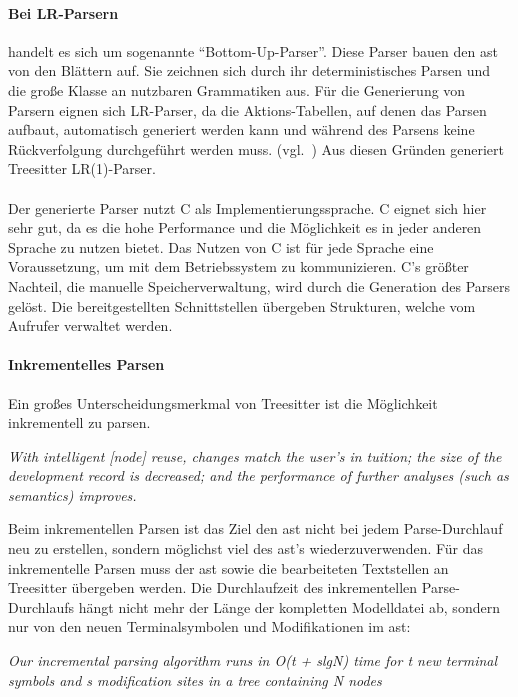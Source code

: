 \documentclass[./einleitung.tex]{subfiles}
\begin{document}
\paragraph[LR-Parsern]{Bei LR-Parsern}\label{par:lr-parser} handelt es sich um sogenannte ``Bottom-Up-Parser''.
Diese Parser bauen den \acrshort{ast} von den Blättern auf.
Sie zeichnen sich durch ihr deterministisches Parsen und die große Klasse an nutzbaren Grammatiken aus.\newline
Für die Generierung von Parsern eignen sich LR-Parser, da die Aktions-Tabellen, auf denen das Parsen aufbaut, automatisch generiert werden kann und während des Parsens keine Rückverfolgung durchgeführt werden muss. (vgl.~\cite{aho1974lr})
Aus diesen Gründen generiert Treesitter LR(1)-Parser.
\\\\
Der generierte Parser nutzt C als Implementierungssprache.
C eignet sich hier sehr gut, da es die hohe Performance und die Möglichkeit es in jeder anderen Sprache zu nutzen bietet.
Das Nutzen von C ist für jede Sprache eine Voraussetzung, um mit dem Betriebssystem zu kommunizieren.
C's größter Nachteil, die manuelle Speicherverwaltung, wird durch die Generation des Parsers gelöst.
Die bereitgestellten Schnittstellen übergeben Strukturen, welche vom Aufrufer verwaltet werden.
\paragraph{Inkrementelles Parsen}
Ein großes Unterscheidungsmerkmal von Treesitter ist die Möglichkeit inkrementell zu parsen.
\newline
 \begin{center}
 \textit{With intelligent [node] reuse, changes match the user’s in
tuition; the size of the development record is decreased; and the performance
 of further analyses (such as semantics) improves.\cite{twagner}}
 \end{center}
Beim inkrementellen Parsen ist das Ziel den \acrshort{ast} nicht bei jedem Parse-Durchlauf neu zu erstellen, sondern möglichst viel des \acrshort{ast}'s wiederzuverwenden.
Für das inkrementelle Parsen muss der \acrshort{ast} sowie die bearbeiteten Textstellen an Treesitter übergeben werden.
Die Durchlaufzeit des inkrementellen Parse-Durchlaufs hängt nicht mehr der Länge der kompletten Modelldatei ab, sondern nur von den neuen Terminalsymbolen und Modifikationen im \acrshort{ast}:
 \newline
 \begin{center}
 \textit{Our incremental parsing algorithm runs in O(t + slgN) time for t new terminal symbols and s modification sites in a tree containing N nodes \cite{twagner}}
 \end{center}
\end{document}

